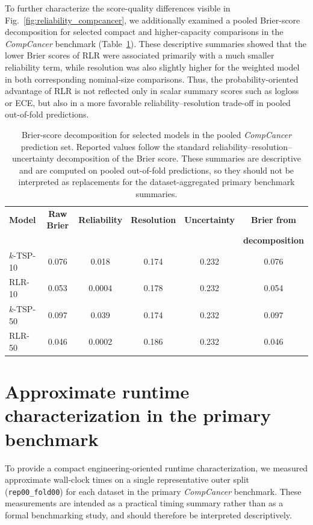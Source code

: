\documentclass[11pt, a4paper]{article}
\newcommand{\stdtablefont}{\small}
\newcommand{\stdtablelayout}{%
  \stdtablefont
  \setlength{\tabcolsep}{4pt}
  \renewcommand{\arraystretch}{1.2}
}
\begin{document}
To further characterize the score-quality differences visible in Fig.~\ref{fig:reliability_compcancer}, we additionally examined a pooled Brier-score decomposition for selected compact and higher-capacity comparisons in the \emph{CompCancer} benchmark (Table~\ref{tab:brier_decomposition_compcancer}). These descriptive summaries showed that the lower Brier scores of RLR were associated primarily with a much smaller reliability term, while resolution was also slightly higher for the weighted model in both corresponding nominal-size comparisons. Thus, the probability-oriented advantage of RLR is not reflected only in scalar summary scores such as logloss or ECE, but also in a more favorable reliability--resolution trade-off in pooled out-of-fold predictions.

\begin{table}[!htbp]
\centering
\caption{Brier-score decomposition for selected models in the pooled \emph{CompCancer} prediction set. Reported values follow the standard reliability--resolution--uncertainty decomposition of the Brier score. These summaries are descriptive and are computed on pooled out-of-fold predictions, so they should not be interpreted as replacements for the dataset-aggregated primary benchmark summaries.}
\label{tab:brier_decomposition_compcancer}
{\stdtablelayout
\begin{tabular}{lccccc}
\toprule
\textbf{Model} & \textbf{Raw Brier} & \textbf{Reliability} & \textbf{Resolution} & \textbf{Uncertainty} & \textbf{Brier from} \\
 & & & & & \textbf{decomposition} \\
\midrule
$k$-TSP-10 & 0.076 & 0.018  & 0.174 & 0.232 & 0.076 \\
RLR-10     & 0.053 & 0.0004 & 0.178 & 0.232 & 0.054 \\
\midrule
$k$-TSP-50 & 0.097 & 0.039  & 0.174 & 0.232 & 0.097 \\
RLR-50     & 0.046 & 0.0002 & 0.186 & 0.232 & 0.046 \\
\bottomrule
\end{tabular}
}
\end{table}

\section{Approximate runtime characterization in the primary benchmark}

To provide a compact engineering-oriented runtime characterization, we measured approximate wall-clock times on a single representative outer split (\texttt{rep00\_fold00}) for each dataset in the primary \emph{CompCancer} benchmark. These measurements are intended as a practical timing summary rather than as a formal benchmarking study, and should therefore be interpreted descriptively.
\end{document}
